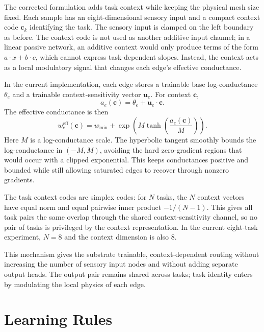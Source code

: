 \documentclass[11pt]{article}
\begin{document}
The corrected formulation adds task context while keeping the physical
mesh size fixed. Each sample has an eight-dimensional sensory input and
a compact context code $\mathbf{c}_k$ identifying the task. The sensory
input is clamped on the left boundary as before. The context code is not
used as another additive input channel; in a linear passive network, an
additive context would only produce terms of the form $a\cdot x + b\cdot
c$, which cannot express task-dependent slopes. Instead, the context
acts as a local modulatory signal that changes each edge's effective
conductance.

In the current implementation, each edge stores a trainable base
log-conductance $\theta_e$ and a trainable context-sensitivity vector
$\mathbf{u}_e$. For context $\mathbf{c}$,
\begin{equation}
\label{eq:context-mod}
a_e(\mathbf{c}) = \theta_e + \mathbf{u}_e \cdot \mathbf{c}.
\end{equation}
The effective conductance is then
\begin{equation}
\label{eq:context-mod-conductance}
w^{\mathrm{eff}}_e(\mathbf{c}) =
w_{\min} + \exp\!\left(M \tanh\!\left(\frac{a_e(\mathbf{c})}{M}\right)\right).
\end{equation}
Here $M$ is a log-conductance scale. The hyperbolic tangent smoothly
bounds the log-conductance in $(-M,M)$, avoiding the hard zero-gradient
regions that would occur with a clipped exponential. This keeps
conductances positive and bounded while still allowing saturated edges
to recover through nonzero gradients.

The task context codes are simplex codes: for $N$ tasks, the $N$ context
vectors have equal norm and equal pairwise inner product
$-1/(N-1)$. This gives all task pairs the same overlap through the
shared context-sensitivity channel, so no pair of tasks is privileged by
the context representation. In the current eight-task experiment,
$N=8$ and the context dimension is also $8$.

This mechanism gives the substrate trainable, context-dependent routing
without increasing the number of sensory input nodes and without adding
separate output heads. The output pair remains shared across tasks; task
identity enters by modulating the local physics of each edge.

\section{Learning Rules}
\end{document}
